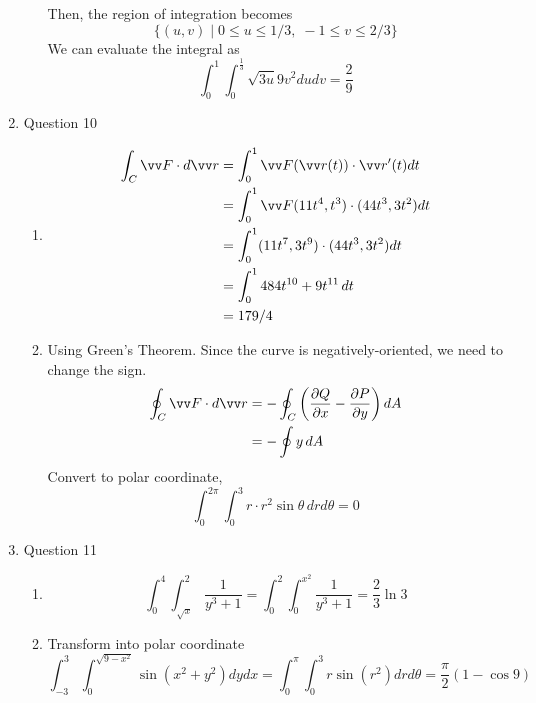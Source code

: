 \documentclass[11pt]{article}
\newcommand{\partialderiv}[2] {\frac{\partial #1}{\partial #2}}
\begin{document}
\begin{enumerate}
\begin{enumerate}
        Then, the region of integration becomes
        $$
        \{ (u,v) \mid 0 \leq u \leq 1/3,\; -1 \leq v \leq 2/3 \}
        $$
        We can evaluate the integral as
        $$
        \int_{0}^{1}\int_{0}^{\frac{1}{3}}\sqrt{3u}9v^{2}dudv = \frac{2}{9}
        $$
    \end{enumerate}
    
    \item Question 10
    \begin{enumerate}
        \item 
        $$
        \begin{aligned}
        \int_C \vv F \cdot d\vv r &= \int_0^1 \vv F(\vv r(t)) \cdot \vv r'(t) dt \\
        &= \int_0^1 \vv F(11t^4, t^3) \cdot (44t^3, 3t^2) dt \\
        &= \int_0^1 (11t^7, 3t^9) \cdot (44t^3, 3t^2) dt \\
        &= \int_0^1 484t^{10} + 9t^{11} \, dt \\
        &= 179/4
        \end{aligned}
        $$
        
        \item
        
        Using Green's Theorem. Since the curve is negatively-oriented, we need to change the sign.
        $$
        \begin{aligned}
        \oint_C \vv F \cdot d\vv r &= -\oint_C \left( \partialderiv{Q}{x} - \partialderiv{P}{y} \right) dA \\
        &= -\oint y \, dA
        \end{aligned}
        $$
        Convert to polar coordinate,
        $$
        \int_{0}^{2\pi} \int_0^3 r\cdot r^2 \sin\theta \, drd\theta = 0
        $$
    \end{enumerate}
    
    \item Question 11
    \begin{enumerate}
        \item 
        $$
        \int_0^4 \int_{\sqrt{x}}^2 \frac{1}{y^3+1} = \int_0^2 \int_0^{x^2} \frac{1}{y^3+1} = \frac{2}{3} \ln 3
        $$
        
        \item Transform into polar coordinate
        $$
        \int_{-3}^3 \int_0^{\sqrt{9-x^2}} \sin(x^2+y^2) dydx = \int_0^\pi \int_0^3 r\sin(r^2) dr d\theta = \frac{\pi}{2}(1-\cos9)
        $$
    \end{enumerate}
\end{enumerate} 
\end{document}
